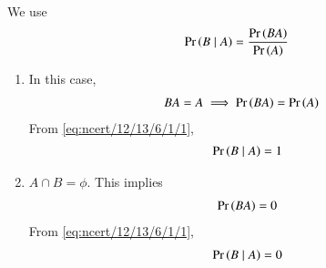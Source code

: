 		We use 
\begin{align}
\pr{B \mid A}=\frac{\pr{BA}}{\pr{A}} \label{eq:ncert/12/13/6/1/1}
\end{align}
\begin{enumerate}
\item In this case,
\begin{align}
BA &= A \implies 
\Pr\left(BA\right) = \Pr\left(A\right)
\end{align}
From \eqref{eq:ncert/12/13/6/1/1}, 
\begin{align}
\Pr\left(B \mid A\right)= 1
\end{align}
\item $A \cap B = \phi$. This implies
\begin{align}
\Pr\left(BA\right) = 0
\end{align}
From \eqref{eq:ncert/12/13/6/1/1},
\begin{align}
\Pr\left(B \mid A\right)= 0
\end{align}
\end{enumerate}



